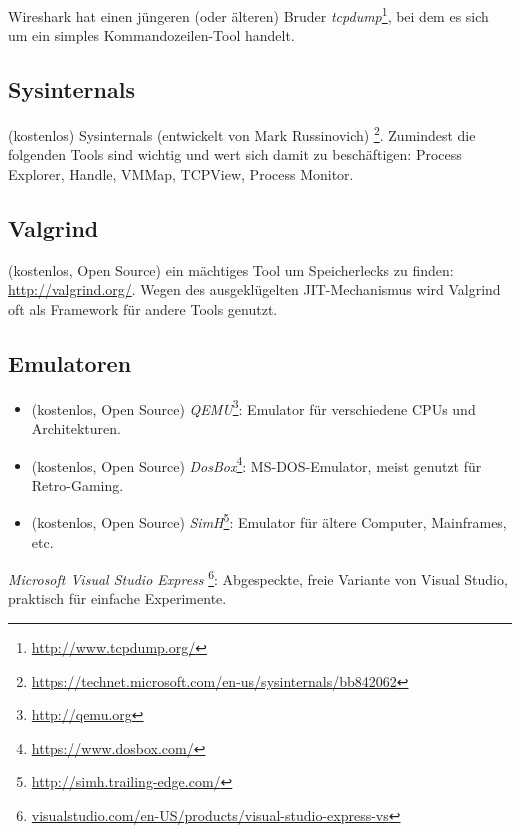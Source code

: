 Wireshark hat einen jüngeren (oder älteren) Bruder \emph{tcpdump}\footnote{\url{http://www.tcpdump.org/}},
bei dem es sich um ein simples Kommandozeilen-Tool handelt.

\subsection{Sysinternals}

(kostenlos) Sysinternals (entwickelt von Mark Russinovich)
\footnote{\url{https://technet.microsoft.com/en-us/sysinternals/bb842062}}.
Zumindest die folgenden Tools sind wichtig und wert sich damit zu beschäftigen:
Process Explorer, Handle, VMMap, TCPView, Process Monitor.

\subsection{Valgrind}

(kostenlos, Open Source) ein mächtiges Tool um Speicherlecks zu finden: \url{http://valgrind.org/}.
Wegen des ausgeklügelten \ac{JIT}-Mechanismus wird Valgrind oft als Framework für andere Tools genutzt.


\subsection{Emulatoren}

\begin{itemize}
\item (kostenlos, Open Source) \emph{QEMU}\footnote{\url{http://qemu.org}}: Emulator für verschiedene CPUs und Architekturen.

\item (kostenlos, Open Source) \emph{DosBox}\footnote{\url{https://www.dosbox.com/}}: MS-DOS-Emulator, meist genutzt für Retro-Gaming.

\item (kostenlos, Open Source) \emph{SimH}\footnote{\url{http://simh.trailing-edge.com/}}: Emulator für ältere Computer, Mainframes, etc.
\end{itemize}


\emph{Microsoft Visual Studio Express}
\footnote{\href{http://go.yurichev.com/17034}{visualstudio.com/en-US/products/visual-studio-express-vs}}:
Abgespeckte, freie Variante von Visual Studio, praktisch für einfache Experimente.


